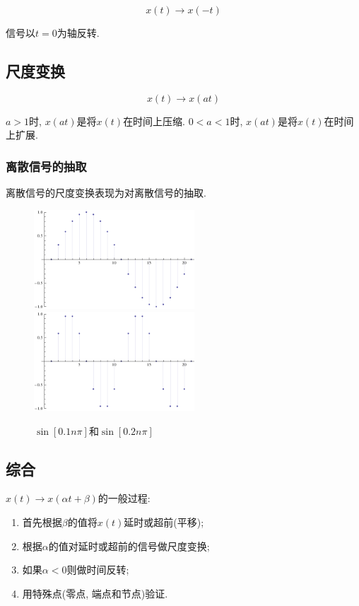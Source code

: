         \[x(t)\to x(-t)\]

        信号以$t=0$为轴反转.

    \subsection{尺度变换}

        \[x(t)\to x(at)\]

        $a>1$时, $x(at)$是将$x(t)$在时间上压缩. $0<a<1$时, $x(at)$是将$x(t)$在时间上扩展.

        \subsubsection{离散信号的抽取}

            离散信号的尺度变换表现为对离散信号的抽取.

            \begin{figure}[h]\centering
                \includegraphics[width=6cm]{signals_chaps/lect2_inc/dt-time-shift-o.pdf} \raisebox{1.8cm}{$\to$} \includegraphics[width=6cm]{signals_chaps/lect2_inc/dt-time-shift-a.pdf}
                \caption{$\sin[0.1n\pi]$和$\sin[0.2n\pi]$}
                \label{fig:2:dt-time-shift-example}
            \end{figure}

    \subsection{综合}

        $x(t)\to x(\alpha t+\beta)$的一般过程:
        \begin{enumerate}
            \item 首先根据$\beta$的值将$x(t)$延时或超前(平移);
            \item 根据$\alpha$的值对延时或超前的信号做尺度变换;
            \item 如果$\alpha<0$则做时间反转;
            \item 用特殊点(零点, 端点和节点)验证.
        \end{enumerate}

